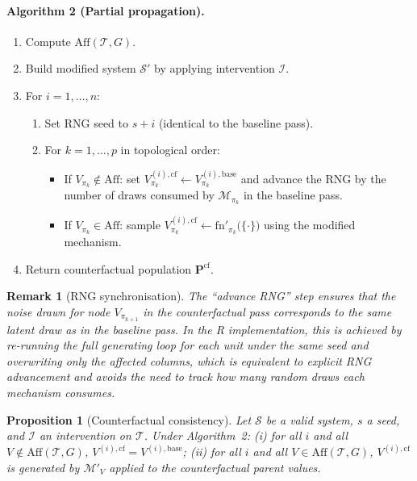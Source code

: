 \documentclass[12pt,a4paper]{article}
\newcommand{\proglang}[1]{\textsf{#1}}
\newtheorem{proposition}{Proposition}[section]
\newtheorem{remark}{Remark}[section]
\begin{document}
\paragraph{Algorithm 2 (Partial propagation).}
\begin{enumerate}
  \item Compute $\mathrm{Aff}(\mathcal{T}, G)$.
  \item Build modified system $\mathcal{S}'$ by applying intervention $\mathcal{I}$.
  \item For $i = 1,\ldots,n$:
        \begin{enumerate}
          \item Set RNG seed to $s + i$ (identical to the baseline pass).
          \item For $k = 1,\ldots,p$ in topological order:
                \begin{itemize}[nosep]
                  \item If $V_{\pi_k}\notin\mathrm{Aff}$: set
                        $V_{\pi_k}^{(i),\mathrm{cf}} \leftarrow
                        V_{\pi_k}^{(i),\mathrm{base}}$ and advance the
                        RNG by the number of draws consumed by
                        $\mathcal{M}_{\pi_k}$ in the baseline pass.
                  \item If $V_{\pi_k}\in\mathrm{Aff}$: sample
                        $V_{\pi_k}^{(i),\mathrm{cf}} \leftarrow
                        \mathrm{fn}'_{\pi_k}\!\bigl(\{\cdot\}\bigr)$
                        using the modified mechanism.
                \end{itemize}
        \end{enumerate}
  \item Return counterfactual population $\mathbf{P}^{\mathrm{cf}}$.
\end{enumerate}

\begin{remark}[RNG synchronisation]
The ``advance RNG'' step ensures that the noise drawn for node $V_{\pi_{k+1}}$ in
the counterfactual pass corresponds to the same latent draw as in the baseline
pass. In the \proglang{R} implementation, this is achieved by re-running the full
generating loop for each unit under the same seed and overwriting only the
affected columns, which is equivalent to explicit RNG advancement and avoids the
need to track how many random draws each mechanism consumes.
\end{remark}

\begin{proposition}[Counterfactual consistency]
\label{prop:cf}
Let $\mathcal{S}$ be a valid system, $s$ a seed, and $\mathcal{I}$ an intervention
on $\mathcal{T}$. Under Algorithm~2: (i) for all $i$ and all
$V\notin\mathrm{Aff}(\mathcal{T},G)$,
$V^{(i),\mathrm{cf}} = V^{(i),\mathrm{base}}$; (ii) for all $i$ and all
$V\in\mathrm{Aff}(\mathcal{T},G)$, $V^{(i),\mathrm{cf}}$ is generated by
$\mathcal{M}'_V$ applied to the counterfactual parent values.
\end{proposition}
\end{document}
